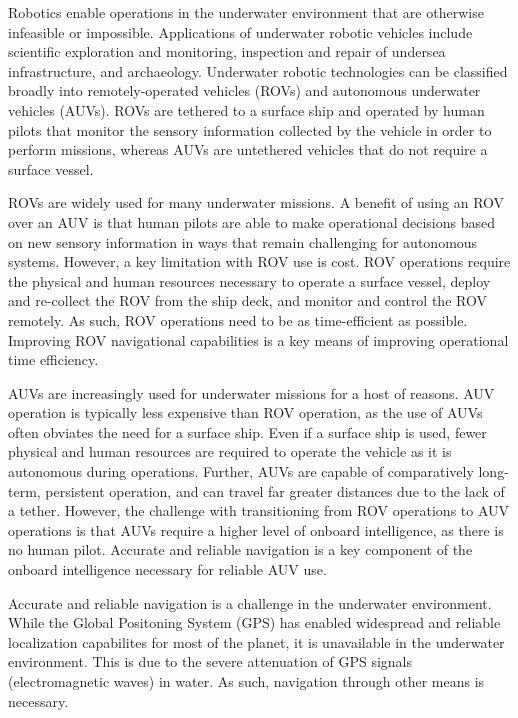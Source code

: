

Robotics enable operations in the underwater environment that are otherwise infeasible or impossible.
Applications of underwater robotic vehicles include scientific exploration and monitoring, inspection and repair of undersea infrastructure, and archaeology.
Underwater robotic technologies can be classified broadly into remotely-operated vehicles (ROVs) and autonomous underwater vehicles (AUVs).
ROVs are tethered to a surface ship and operated by human pilots that monitor the sensory information collected by the vehicle in order to perform missions, whereas  AUVs are untethered vehicles that do not require a surface vessel.

ROVs are widely used for many underwater missions.
A benefit of using an ROV over an AUV is that human pilots are able to make operational decisions based on new sensory information in ways that remain challenging for autonomous systems.
However, a key limitation with ROV use is cost.
ROV operations require the physical and human resources necessary to operate a surface vessel, deploy and re-collect the ROV from the ship deck, and monitor and control the ROV remotely.  
As such, ROV operations need to be as time-efficient as possible.
Improving ROV navigational capabilities is a key means of improving operational time efficiency.

AUVs are increasingly used for underwater missions for a host of reasons.
AUV operation is typically less expensive than ROV operation, as the use of AUVs often obviates the need for a surface ship.
Even if a surface ship is used, fewer physical and human resources are required to operate the vehicle as it is autonomous during operations.
Further, AUVs are capable of comparatively long-term, persistent operation, and can travel far greater distances due to the lack of a tether.
However, the challenge with transitioning from ROV operations to AUV operations is that AUVs require a higher level of onboard intelligence, as there is no human pilot.
Accurate and reliable navigation is a key component of the onboard intelligence necessary for reliable AUV use.

Accurate and reliable navigation is a challenge in the underwater environment.
While the Global Positoning System (GPS) has enabled widespread and reliable localization capabilites for most of the planet, it is unavailable in the underwater environment.
This is due to the severe attenuation of GPS signals (electromagnetic waves) in water.  
As such, navigation through other means is necessary.

